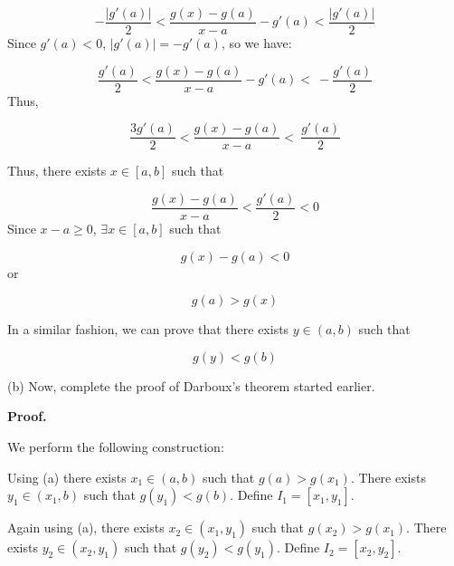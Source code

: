 \documentclass[10pt]{article}
\begin{document}
\begin{equation*}
-\frac{|g'( a) |}{2} < \frac{g( x) -g( a)}{x-a} -g'( a) < \frac{|g'( a) |}{2}
\end{equation*}
Since $\displaystyle g'( a) < 0$, $\displaystyle |g'( a) |=-g'( a)$, so we have:


\begin{equation*}
\frac{g'( a)}{2} < \frac{g( x) -g( a)}{x-a} -g'( a) < \ -\frac{g'( a)}{2}
\end{equation*}
Thus,


\begin{equation*}
\frac{3g'( a)}{2} < \frac{g( x) -g( a)}{x-a} < \ \frac{g'( a)}{2}
\end{equation*}


Thus, there exists $\displaystyle x\in [ a,b]$ such that 


\begin{equation*}
\frac{g( x) -g( a)}{x-a} < \frac{g'( a)}{2} < 0
\end{equation*}
Since $\displaystyle x-a\geq 0$, $\displaystyle \exists x\in [ a,b]$ such that


\begin{equation*}
g( x) -g( a) < 0
\end{equation*}
or


\begin{equation*}
g( a)  >g( x)
\end{equation*}


In a similar fashion, we can prove that there exists $\displaystyle y\in ( a,b)$ such that


\begin{equation*}
g( y) < g( b)
\end{equation*}


(b) Now, complete the proof of Darboux's theorem started earlier.



\textbf{Proof.}



We perform the following construction:



Using (a) there exists $\displaystyle x_{1} \in ( a,b)$ such that $\displaystyle g( a)  >g( x_{1})$. There exists $\displaystyle y_{1} \in ( x_{1} ,b)$ such that $\displaystyle g( y_{1}) < g( b)$. Define $\displaystyle I_{1} =[ x_{1} ,y_{1}]$.

 

Again using (a), there exists $\displaystyle x_{2} \in ( x_{1} ,y_{1})$ such that $\displaystyle g( x_{2})  >g( x_{1})$. There exists $\displaystyle y_{2} \in ( x_{2} ,y_{1})$ such that $\displaystyle g( y_{2}) < g( y_{1})$. Define $\displaystyle I_{2} =[ x_{2} ,y_{2}]$.
\end{document}
